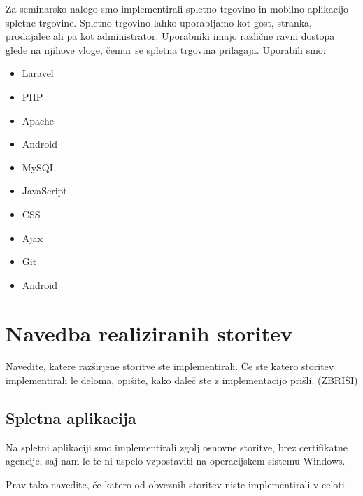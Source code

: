 \documentclass[a4paper,12pt]{report}
\begin{document}
Za seminarsko nalogo smo implementirali spletno trgovino in mobilno aplikacijo spletne trgovine. Spletno trgovino lahko uporabljamo kot gost, stranka, prodajalec ali pa kot administrator. Uporabniki imajo različne ravni dostopa glede na njihove vloge, čemur se spletna trgovina prilagaja.
\vskip 0.2in
Uporabili smo:
\begin{itemize}
    \item Laravel
    \item PHP
	\item Apache
	\item Android
	\item MySQL
	\item JavaScript
	\item CSS
	\item Ajax
	\item Git
	\item Android
	    
	 
\end{itemize}


\chapter{Navedba realiziranih storitev}
Navedite, katere razširjene storitve ste implementirali. Če ste katero storitev implementirali le deloma, opišite, kako daleč ste z implementacijo prišli.  (ZBRIŠI)
\newline
\section{Spletna aplikacija}
Na spletni aplikaciji smo implementirali zgolj osnovne storitve, brez certifikatne agencije, saj nam le te ni uspelo vzpostaviti na operacijskem sistemu Windows.

Prav tako navedite, če katero od obveznih storitev niste implementirali v celoti.
\end{document}
